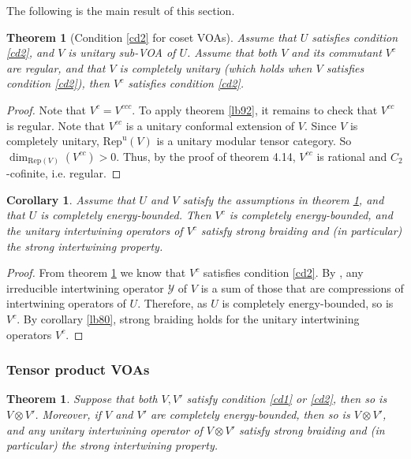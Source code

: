 \documentclass[12pt,a4paper]{article}
\theoremstyle{definition}
\theoremstyle{plain}
\newtheorem{thm}[df]{Theorem}
\newtheorem{co}[df]{Corollary}
\newcommand{\mc}{\mathcal}
\newcommand{\Rep}{\mathrm{Rep}}
\newcommand{\Repu}{\mathrm{Rep}^{\mathrm u}}
\numberwithin{equation}{subsection}
\begin{document}
The following is the main result of this section.

\begin{thm}[Condition \ref{cd2} for coset VOAs]\label{lb93}
Assume that $U$ satisfies condition \ref{cd2}, and $V$ is  unitary sub-VOA of $U$. Assume that both $V$ and its commutant $V^c$ are regular, and that $V$ is completely unitary (which holds when $V$ satisfies condition \ref{cd2}), then $V^c$ satisfies condition \ref{cd2}.
\end{thm}

\begin{proof}
Note that $V^c=V^{ccc}$. To apply theorem \ref{lb92}, it remains to check that $V^{cc}$ is regular. Note that $V^{cc}$ is a unitary conformal extension of $V$. Since $V$ is completely unitary, $\Repu(V)$ is a unitary modular tensor category. So $\dim_{\Rep(V)}(V^{cc})>0$. Thus, by the proof of \cite{McR19} theorem 4.14, $V^{cc}$ is rational and $C_2$-cofinite, i.e. regular.
\end{proof}





\begin{co}\label{lb79}
Assume that $U$ and $V$ satisfy the assumptions in theorem \ref{lb93}, and that $U$ is completely energy-bounded. Then  $V^c$ is completely energy-bounded, and the unitary intertwining operators of $V^c$  satisfy strong braiding and (in particular) the strong intertwining property.
\end{co}

\begin{proof}
From theorem \ref{lb93} we know that $V^c$ satisfies condition \ref{cd2}.  By \cite{Gui20a}, any irreducible intertwining operator $\mc Y$ of $V$ is a sum of those that are compressions of intertwining operators of $U$. Therefore, as $U$ is completely energy-bounded, so is $V^c$. By corollary \ref{lb80},   strong braiding holds for the unitary intertwining operators $V^c$.
\end{proof}



\subsubsection*{Tensor product VOAs}



\begin{thm}\label{lb83}
Suppose that both $V,V'$ satisfy condition \ref{cd1} or \ref{cd2}, then so is $V\otimes V'$. Moreover, if $V$ and $V'$ are completely energy-bounded, then so is $V\otimes V'$, and any unitary intertwining operator of $V\otimes V'$ satisfy strong braiding and (in particular) the strong intertwining property.
\end{thm}
\end{document}

